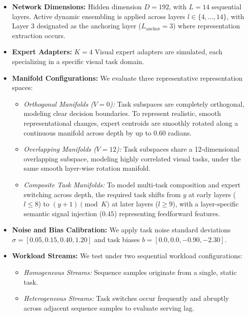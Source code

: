 \begin{itemize}
    \item \textbf{Network Dimensions:} Hidden dimension $D = 192$, with $L = 14$ sequential layers. Active dynamic ensembling is applied across layers $l \in \{4, \dots, 14\}$, with Layer 3 designated as the anchoring layer ($L_{\text{anchor}} = 3$) where representation extraction occurs.
    \item \textbf{Expert Adapters:} $K = 4$ Visual expert adapters are simulated, each specializing in a specific visual task domain.
    \item \textbf{Manifold Configurations:} We evaluate three representative representation spaces:
    \begin{itemize}
        \item \emph{Orthogonal Manifolds ($V=0$):} Task subspaces are completely orthogonal, modeling clear decision boundaries. To represent realistic, smooth representational changes, expert centroids are smoothly rotated along a continuous manifold across depth by up to $0.60$ radians.
        \item \emph{Overlapping Manifolds ($V=12$):} Task subspaces share a 12-dimensional overlapping subspace, modeling highly correlated visual tasks, under the same smooth layer-wise rotation manifold.
        \item \emph{Composite Task Manifolds:} To model multi-task composition and expert switching across depth, the required task shifts from $y$ at early layers ($l \le 8$) to $(y + 1) \pmod K$ at later layers ($l \ge 9$), with a layer-specific semantic signal injection ($0.45$) representing feedforward features.
    \end{itemize}
    \item \textbf{Noise and Bias Calibration:} We apply task noise standard deviations $\sigma = [0.05, 0.15, 0.40, 1.20]$ and task biases $b = [0.0, 0.0, -0.90, -2.30]$.
    \item \textbf{Workload Streams:} We test under two sequential workload configurations:
    \begin{itemize}
        \item \emph{Homogeneous Streams:} Sequence samples originate from a single, static task.
        \item \emph{Heterogeneous Streams:} Task switches occur frequently and abruptly across adjacent sequence samples to evaluate serving lag.
    \end{itemize}
\end{itemize}


